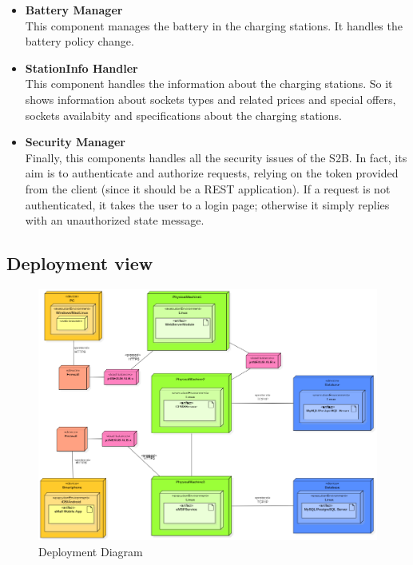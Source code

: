 \begin{itemize}
    \item \textbf{Battery Manager}\\This component manages the battery in the charging stations. It handles the battery policy change.
    \item \textbf{StationInfo Handler}\\This component handles the information about the charging stations. So it shows information about sockets types and related prices and special offers, sockets availabity and specifications about the charging stations.
 
    \item \textbf{Security Manager}\\Finally, this components handles all the security issues of the S2B. In fact, its aim is to authenticate and authorize requests, relying on the token provided from the client (since it should be a REST application). If a request is not authenticated, it takes the user to a login page; otherwise it simply replies with an unauthorized state message.
\end{itemize}

\subsection{Deployment view}

\begin{figure}[H]
    \begin{center}
        \includegraphics[width=\textwidth]{img/DeploymentDiagram.PNG}
        \caption{Deployment Diagram}\label{deployment_diagram}
    \end{center}
\end{figure}

